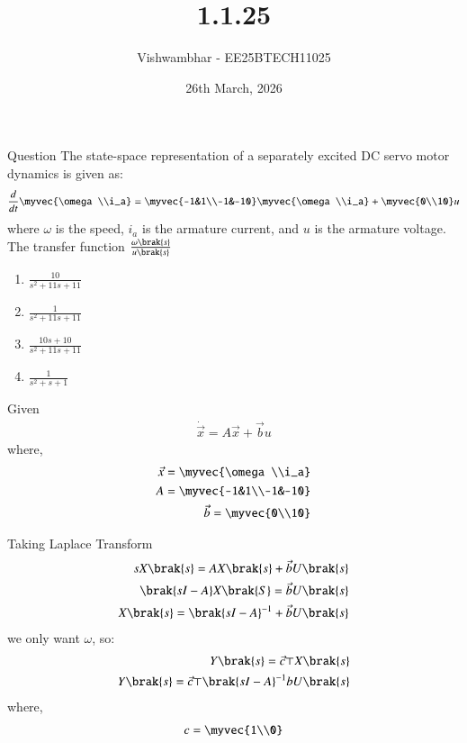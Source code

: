 \documentclass{beamer}
\title{1.1.25}
\date{26th March, 2026}
\author{Vishwambhar - EE25BTECH11025}
\begin{document}
\frame{\titlepage}
\begin{frame}{Question}
The state-space representation of a separately excited DC servo motor dynamics is given as:
\begin{align}
    \frac{d}{dt}\myvec{\omega\\i_a}=\myvec{-1&1\\-1&-10}\myvec{\omega\\i_a}+\myvec{0\\10}u
\end{align}
where $\omega$ is the speed, $i_a$ is the armature current, and $u$ is the armature voltage.\\
The transfer function $\frac{\omega\brak{s}}{u\brak{s}}$ 
\begin{enumerate}
    \item $\frac{10}{s^2+11s+11}$
    \item $\frac{1}{s^2+11s+11}$
    \item $\frac{10s+10}{s^2+11s+11}$
    \item $\frac{1}{s^2+s+1}$
\end{enumerate}
\end{frame}

\begin{frame}{Given}
\begin{align}
    \dot{\vec{x}}=A\vec{x}+\vec{b}u
\end{align}
where,
\begin{align}
    \vec{x}=\myvec{\omega\\i_a}\\
    A=\myvec{-1&1\\-1&-10}\\
    \vec{b}=\myvec{0\\10}
\end{align}
\end{frame}

\begin{frame}{Taking Laplace Transform}
\begin{align}
sX\brak{s}=AX\brak{s}+\vec{b}U\brak{s}\\
    \brak{sI-A}X\brak{S}=\vec{b}U\brak{s}\\
    X\brak{s}=\brak{sI-A}^{-1}+\vec{b}U\brak{s}
\end{align}
we only want $\omega$, so:
\begin{align}
    Y\brak{s}=\vec{c}\top X\brak{s}\\
    Y\brak{s}=\vec{c}\top \brak{sI-A}^{-1}bU\brak{s}
\end{align}
where,
\begin{align}
    c=\myvec{1\\0}
\end{align}
\end{frame}
\end{document}
